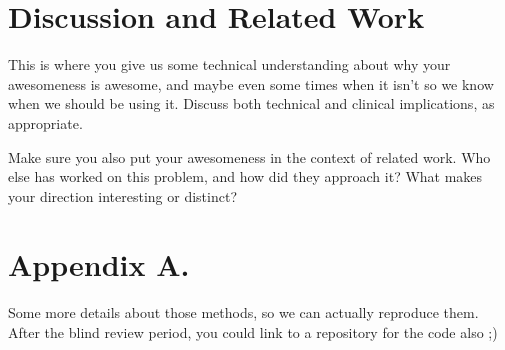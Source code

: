 \documentclass[twoside,11pt]{article}
\begin{document}
\section{Discussion and Related Work} 

This is where you give us some technical understanding about why your
awesomeness is awesome, and maybe even some times when it isn't so we
know when we should be using it.  Discuss both technical and clinical
implications, as appropriate.  

Make sure you also put your awesomeness in the context of related
work.  Who else has worked on this problem, and how did they approach
it?  What makes your direction interesting or distinct?





\appendix
\section*{Appendix A.}

Some more details about those methods, so we can actually reproduce
them.  After the blind review period, you could link to a repository
for the code also ;) 
\end{document}
